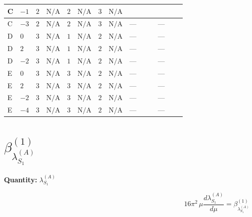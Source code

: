 \documentclass[8pt]{article}
\begin{document}
\begin{landscape}
\begin{longtable}{@{}llcccccc >{\raggedright\arraybackslash}p{0.21\linewidth} >{\raggedright\arraybackslash}p{0.21\linewidth}@{}}
\midrule
C & $-1$ & $2$ & $\text{N/A}$ & $2$ & $\text{N/A}$ & $3$ & $\text{N/A}$ & \scriptsize\adjustbox{max width=\linewidth}{$\begin{gathered} +4 {\lambda_{HS_2}^{(A)}} {\lambda_{8}}\end{gathered}$} & \scriptsize\adjustbox{max width=\linewidth}{$\begin{gathered} +2 {\lambda_{8}} {\lambda_{S_2}^{(1)}}\end{gathered}$} \\
\midrule
C & $-3$ & $2$ & $\text{N/A}$ & $2$ & $\text{N/A}$ & $3$ & $\text{N/A}$ & --- & --- \\
\midrule
D & $0$ & $3$ & $\text{N/A}$ & $1$ & $\text{N/A}$ & $2$ & $\text{N/A}$ & --- & --- \\
\midrule
D & $2$ & $3$ & $\text{N/A}$ & $1$ & $\text{N/A}$ & $2$ & $\text{N/A}$ & --- & --- \\
\midrule
D & $-2$ & $3$ & $\text{N/A}$ & $1$ & $\text{N/A}$ & $2$ & $\text{N/A}$ & --- & --- \\
\midrule
E & $0$ & $3$ & $\text{N/A}$ & $3$ & $\text{N/A}$ & $2$ & $\text{N/A}$ & --- & --- \\
\midrule
E & $2$ & $3$ & $\text{N/A}$ & $3$ & $\text{N/A}$ & $2$ & $\text{N/A}$ & --- & --- \\
\midrule
E & $-2$ & $3$ & $\text{N/A}$ & $3$ & $\text{N/A}$ & $2$ & $\text{N/A}$ & --- & --- \\
\midrule
E & $-4$ & $3$ & $\text{N/A}$ & $3$ & $\text{N/A}$ & $2$ & $\text{N/A}$ & --- & --- \\
\midrule
\bottomrule
\end{longtable}
\clearpage
\section*{$\beta_{\lambda_{S_1}^{(A)}}^{(1)}$}
\noindent\textbf{Quantity: }$\lambda_{S_1}^{(A)}$\par\smallskip
\[16\pi^2\,\mu\frac{d \lambda_{S_1}^{(A)}}{d\mu}=\beta_{\lambda_{S_1}^{(A)}}^{(1)}\]

\end{landscape}
\end{document}
